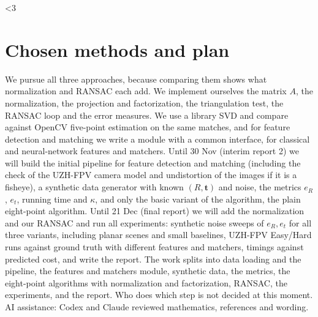 \documentclass[11pt,a4paper]{article}
\newcommand{\stage}{1}
\newif\ifshowguide
\theoremstyle{plain}
\theoremstyle{definition}
\theoremstyle{remark}
\newcommand{\guide}[1]{\ifshowguide\par\smallskip\noindent
  \colorbox{gray!12}{\parbox{\dimexpr\linewidth-2\fboxsep}{\small\itshape
  \textbf{Guidance.} #1}}\par\smallskip\fi}
\newcommand{\bodyend}{\label{body-end}}
\begin{document}
\fi

\ifnum\stage<3
\section{Chosen methods and plan}
\label{sec:plan}

\guide{Interim reports only; this section disappears from the final
report. \emph{Interim report 1}: the planned steps and who does what.
\emph{Interim report 2}: what is not working yet, any change of plan,
and the outline of the final report.}

We pursue all three approaches, because comparing them shows what normalization and RANSAC each add. We implement ourselves the matrix $A$, the normalization, the projection and factorization, the triangulation test, the RANSAC loop and the error measures. We use a library SVD and compare against OpenCV five-point estimation on the same matches, and for feature detection and matching we write a module with a common interface, for classical and neural-network features and matchers. Until 30 Nov (interim report 2) we will build the initial pipeline for feature detection and matching (including the check of the UZH-FPV camera model and undistortion of the images if it is a fisheye), a synthetic data generator with known $(R,\mathbf{t})$ and noise, the metrics $e_R$, $e_t$, running time and $\kappa$, and only the basic variant of the algorithm, the plain eight-point algorithm. Until 21 Dec (final report) we will add the normalization and our RANSAC and run all experiments: synthetic noise sweeps of $e_R,e_t$ for all three variants, including planar scenes and small baselines, UZH-FPV Easy/Hard runs against ground truth with different features and matchers, timings against predicted cost, and write the report. The work splits into data loading and the pipeline, the features and matchers module, synthetic data, the metrics, the eight-point algorithms with normalization and factorization, RANSAC, the experiments, and the report. Who does which step is not decided at this moment. AI assistance: Codex and Claude reviewed mathematics, references and wording.
\fi

\bodyend
\end{document}
